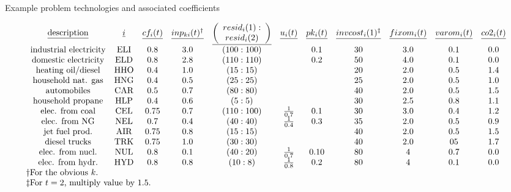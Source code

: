 \begin{landscape}
\begin{table}[ht]
\caption{Example problem technologies and associated coefficients}
\label{ENV:egtech}\footnotesize
\[ 
\begin{array}{l}
\begin{array}{ccccccccccc}
\text{\underline{description}} & \underline{i} & \underline{cf_i(t)} & \underline{inp_{ki}(t)^\dag} & \underline{\left(\begin{array}{c}resid_i(1):\\resid_i(2)\end{array}\right)} & \underline{u_i(t)} & \underline{pk_i(t)} & \underline{invcost_i(1)^\ddag} & \underline{fixom_i(t)} & \underline{varom_i(t)} & \underline{co2_i(t)}\\
\text{industrial electricity} & \text{ELI} & 0.8 & 3.0 & \left(100:100\right) & & 0.1 & 30 & 3.0 & 0.1 & 0.0\\
\text{domestic electricity} & \text{ELD} & 0.8 & 2.8 & \left(110:110\right) & & 0.2 & 50 & 4.0 & 0.1 & 0.0\\
\text{heating oil/diesel} & \text{HHO} & 0.4 & 1.0 & \left(15:15\right) & & & 20 & 2.0 & 0.5 & 1.4\\
\text{household nat. gas} & \text{HNG} & 0.4 & 0.5 & \left(25:25\right) & & & 25 & 2.0 & 0.5 & 1.0\\
\text{automobiles} & \text{CAR} & 0.5 & 0.7 & \left(80:80\right) & & & 40 & 2.0 & 0.5 & 1.5\\
\text{household propane} & \text{HLP} & 0.4 & 0.6 & \left(5:5\right) & & & 30 & 2.5 & 0.8 & 1.1\\
\text{elec. from coal} & \text{CEL} & 0.75 & 0.7 & \left(110:100\right) & \frac{1}{0.7} & 0.1 & 30 & 3.0 & 0.4 & 1.2\\
\text{elec. from NG} & \text{NEL} & 0.7 & 0.4 & \left(40:40\right) & \frac{1}{0.4} & 0.3 & 35 & 2.0 & 0.5 & 0.9\\
\text{jet fuel prod.} & \text{AIR} & 0.75 & 0.8 & \left(15:15\right) &  &  & 40 & 2.0 & 0.5 & 1.5\\
\text{diesel trucks} & \text{TRK} & 0.75 & 1.0 & \left(30:30\right) &  &  & 40 & 2.0 & 05 & 1.7\\
\text{elec. from nucl.} & \text{NUL} & 0.8 & 0.1 & \left(40:20\right) & \frac{1}{0.7} & 0.10 & 80 & 4 & 0.7 & 0.0\\
\text{elec. from hydr.} & \text{HYD} & 0.8 & 0.8 & \left(10:8\right) & \frac{1}{0.8} & 0.2 & 80 & 4 & 0.1 & 0.0
\end{array}\\
\dag \text{For the obvious $k$.}\\
\ddag \text{For $t=2$, multiply value by 1.5.}
\end{array}
\]\normalsize
\end{table}
\end{landscape}%

